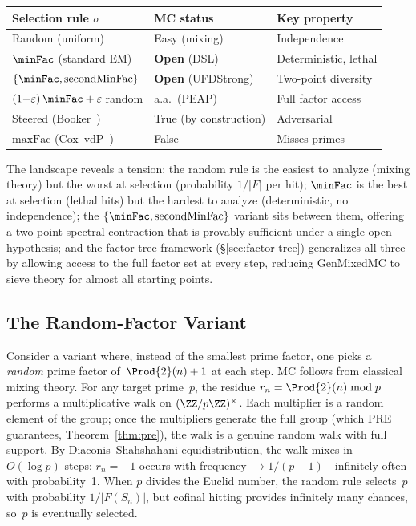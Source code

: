 \smallskip
\begin{center}
\begin{tabular}{@{}l@{\quad}l@{\quad}l@{}}
\toprule
\textbf{Selection rule} $\sigma$ & \textbf{MC status} & \textbf{Key property} \\
\midrule
Random (uniform) & Easy (mixing) & Independence \\
$\minFac$ (standard EM) & \textbf{Open} (DSL) & Deterministic, lethal \\
$\{\minFac, \operatorname{secondMinFac}\}$ & \textbf{Open} (UFDStrong) & Two-point diversity \\
$(1{-}\varepsilon)\,\minFac + \varepsilon\,$random & a.a.\ (PEAP) & Full factor access \\
Steered (Booker~\cite{BoSa2012}) & True (by construction) & Adversarial \\
$\mathrm{maxFac}$ (Cox--vdP~\cite{CoxVdP1968}) & False & Misses primes \\
\bottomrule
\end{tabular}
\end{center}

\smallskip\noindent
The landscape reveals a tension: the random rule is the easiest to
analyze (mixing theory) but the worst at selection (probability
$1/|F|$ per hit); $\minFac$ is the best at selection (lethal hits)
but the hardest to analyze (deterministic, no independence); the
$\{\minFac, \operatorname{secondMinFac}\}$ variant sits between them,
offering a two-point spectral contraction that is provably sufficient
under a single open hypothesis; and the factor tree framework
(\S\ref{sec:factor-tree}) generalizes all three by allowing access
to the full factor set at every step, reducing GenMixedMC to sieve
theory for almost all starting points.

\subsection{The Random-Factor Variant}
\label{sec:random-variant}

Consider a variant where, instead of the smallest prime factor, one
picks a \emph{random} prime factor of~$\Prod{2}(n)+1$ at each step.
MC follows from classical mixing theory.  For any target prime~$p$,
the residue $r_n = \Prod{2}(n) \bmod p$ performs a multiplicative walk
on $(\ZZ/p\ZZ)^\times$.  Each multiplier is a random element of the
group; once the multipliers generate the full group (which PRE
guarantees, Theorem~\ref{thm:pre}), the walk is a genuine random walk
with full support.  By Diaconis--Shahshahani equidistribution, the walk
mixes in $O(\log p)$ steps: $r_n = -1$ occurs with frequency
$\to 1/(p{-}1)$---infinitely often with probability~1.  When $p$
divides the Euclid number, the random rule selects~$p$ with probability
$1/|F(S_n)|$, but cofinal hitting provides infinitely many chances,
so~$p$ is eventually selected.

